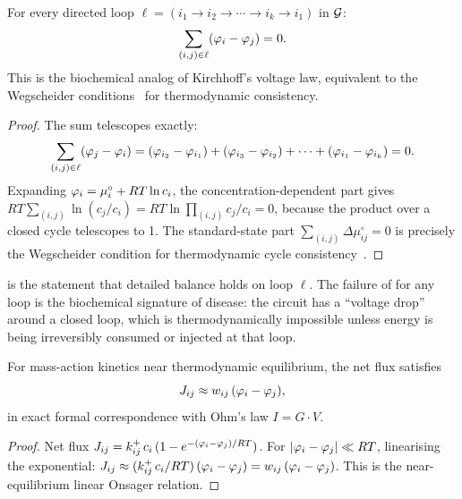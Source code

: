 \begin{theorem}
\label{thm:biochem-kvl}
For every directed loop
$\ell = (i_1 \to i_2 \to \cdots \to i_k \to i_1)$ in $\mathcal{G}$:
\begin{equation}
  \sum_{(i,j)\in\ell}
  (\varphi_i - \varphi_j)
  = 0.
  \label{eq:ch08-kvl}
\end{equation}
This is the biochemical analog of Kirchhoff's voltage law, equivalent to
the Wegscheider conditions~\citep{Wegscheider1901} for thermodynamic
consistency.
\end{theorem}

\begin{proof}
The sum telescopes exactly:
\begin{equation}
  \sum_{(i,j)\in\ell}
  (\varphi_j - \varphi_i)
  = (\varphi_{i_2} - \varphi_{i_1})
  + (\varphi_{i_3} - \varphi_{i_2})
  + \cdots
  + (\varphi_{i_1} - \varphi_{i_k})
  = 0.
\end{equation}
Expanding $\varphi_i = \mu_i^{\circ} + RT\ln c_i$, the
concentration-dependent part gives
$RT \sum_{(i,j)} \ln(c_j/c_i) = RT \ln \prod_{(i,j)} c_j/c_i = 0$,
because the product over a closed cycle telescopes to 1.  The
standard-state part $\sum_{(i,j)} \Delta\mu_{ij}^{\circ} = 0$ is
precisely the Wegscheider condition for thermodynamic cycle
consistency~\citep{Wegscheider1901}.
\end{proof}

 is the statement that detailed balance holds on loop
$\ell$.  The failure of  for any loop is the biochemical
signature of disease: the circuit has a ``voltage drop'' around a closed
loop, which is thermodynamically impossible unless energy is being
irreversibly consumed or injected at that loop.

\begin{corollary}
\label{cor:ohms-law}
For mass-action kinetics near thermodynamic equilibrium, the net flux
satisfies
\begin{equation}
  J_{ij}
  \approx w_{ij}\,(\varphi_i - \varphi_j),
  \label{eq:ohms-law}
\end{equation}
in exact formal correspondence with Ohm's law $I = G \cdot V$.
\end{corollary}

\begin{proof}
Net flux $J_{ij} = k_{ij}^{+}\,c_i\,(1 - e^{-(\varphi_i - \varphi_j)/RT})$.
For $|\varphi_i - \varphi_j| \ll RT$, linearising the
exponential:
$J_{ij} \approx (k_{ij}^{+}\,c_i/RT)\,(\varphi_i - \varphi_j)
= w_{ij}\,(\varphi_i - \varphi_j)$.
This is the near-equilibrium linear Onsager relation.
\end{proof}

